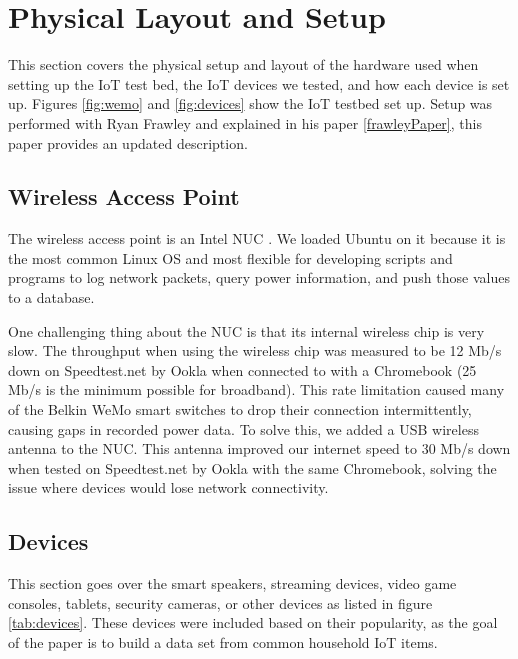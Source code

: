 \section{Physical Layout and Setup}
\label{Physical Layout and Setup}

This section covers the physical setup and layout of the hardware used when setting up the IoT test bed, the IoT devices we tested, and how each device is set up. Figures \ref{fig:wemo} and \ref{fig:devices} show the IoT testbed set up. Setup was performed with Ryan Frawley and explained in his paper \ref{frawleyPaper}, this paper provides an updated description.

\subsection{Wireless Access Point}
\label{Wireless Access Point}
The wireless access point is an Intel NUC \cite{nuc}. We loaded Ubuntu\cite{ubuntu} on it because it is the most common Linux OS \cite{linux} and most flexible for developing scripts and programs to log network packets, query power information, and push those values to a database.

One challenging thing about the NUC is that its internal wireless chip is very slow. The throughput when using the wireless chip was measured to be 12 Mb/s down on Speedtest.net by Ookla \cite{speedtest} when connected to with a Chromebook \cite{chromebook} (25 Mb/s is the minimum possible for broadband). This rate limitation caused many of the Belkin WeMo smart switches \cite{wemo} to drop their connection intermittently, causing gaps in recorded power data. To solve this, we added a USB wireless antenna to the NUC. This antenna improved our internet speed to 30 Mb/s down when tested on Speedtest.net by Ookla with the same Chromebook, solving the issue where devices would lose network connectivity.

\subsection{Devices}
\label{Devices}
This section goes over the smart speakers, streaming devices, video game consoles, tablets, security cameras, or other devices as listed in figure \ref{tab:devices}. These devices were included based on their popularity, as the goal of the paper is to build a data set from common household IoT items.

